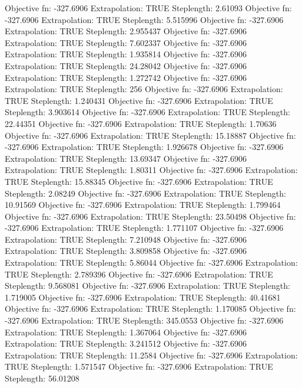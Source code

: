 \documentclass{article}
\begin{document}
\begin{Schunk}
\begin{Soutput}
Objective fn:  -327.6906   Extrapolation:  TRUE   Steplength:  2.61093 
Objective fn:  -327.6906   Extrapolation:  TRUE   Steplength:  5.515996 
Objective fn:  -327.6906   Extrapolation:  TRUE   Steplength:  2.955437 
Objective fn:  -327.6906   Extrapolation:  TRUE   Steplength:  7.602337 
Objective fn:  -327.6906   Extrapolation:  TRUE   Steplength:  1.935814 
Objective fn:  -327.6906   Extrapolation:  TRUE   Steplength:  24.28042 
Objective fn:  -327.6906   Extrapolation:  TRUE   Steplength:  1.272742 
Objective fn:  -327.6906   Extrapolation:  TRUE   Steplength:  256 
Objective fn:  -327.6906   Extrapolation:  TRUE   Steplength:  1.240431 
Objective fn:  -327.6906   Extrapolation:  TRUE   Steplength:  3.903614 
Objective fn:  -327.6906   Extrapolation:  TRUE   Steplength:  22.44351 
Objective fn:  -327.6906   Extrapolation:  TRUE   Steplength:  1.70636 
Objective fn:  -327.6906   Extrapolation:  TRUE   Steplength:  15.18887 
Objective fn:  -327.6906   Extrapolation:  TRUE   Steplength:  1.926678 
Objective fn:  -327.6906   Extrapolation:  TRUE   Steplength:  13.69347 
Objective fn:  -327.6906   Extrapolation:  TRUE   Steplength:  1.80311 
Objective fn:  -327.6906   Extrapolation:  TRUE   Steplength:  15.88345 
Objective fn:  -327.6906   Extrapolation:  TRUE   Steplength:  2.08249 
Objective fn:  -327.6906   Extrapolation:  TRUE   Steplength:  10.91569 
Objective fn:  -327.6906   Extrapolation:  TRUE   Steplength:  1.799464 
Objective fn:  -327.6906   Extrapolation:  TRUE   Steplength:  23.50498 
Objective fn:  -327.6906   Extrapolation:  TRUE   Steplength:  1.771107 
Objective fn:  -327.6906   Extrapolation:  TRUE   Steplength:  7.210948 
Objective fn:  -327.6906   Extrapolation:  TRUE   Steplength:  3.809858 
Objective fn:  -327.6906   Extrapolation:  TRUE   Steplength:  5.86044 
Objective fn:  -327.6906   Extrapolation:  TRUE   Steplength:  2.789396 
Objective fn:  -327.6906   Extrapolation:  TRUE   Steplength:  9.568081 
Objective fn:  -327.6906   Extrapolation:  TRUE   Steplength:  1.719005 
Objective fn:  -327.6906   Extrapolation:  TRUE   Steplength:  40.41681 
Objective fn:  -327.6906   Extrapolation:  TRUE   Steplength:  1.170085 
Objective fn:  -327.6906   Extrapolation:  TRUE   Steplength:  345.0553 
Objective fn:  -327.6906   Extrapolation:  TRUE   Steplength:  1.367064 
Objective fn:  -327.6906   Extrapolation:  TRUE   Steplength:  3.241512 
Objective fn:  -327.6906   Extrapolation:  TRUE   Steplength:  11.2584 
Objective fn:  -327.6906   Extrapolation:  TRUE   Steplength:  1.571547 
Objective fn:  -327.6906   Extrapolation:  TRUE   Steplength:  56.01208 

\end{Soutput}
\end{Schunk}
\end{document}
